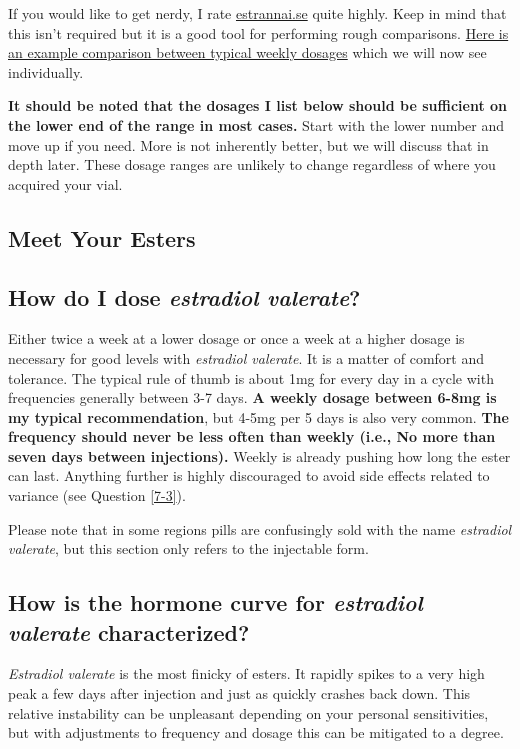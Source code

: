 \documentclass{article}
\begin{document}
If you would like to get nerdy, I rate \href{https://estrannai.se}{estrannai.se} quite highly. Keep in mind that this isn’t required but it is a good tool for performing rough comparisons. \href{https://estrannai.se/\#i0__cu,7,7,1-cu,5,7,3-cu,5,7,2}{Here is an example comparison between typical weekly dosages} which we will now see individually.

\textbf{It should be noted that the dosages I list below should be sufficient on the lower end of the range in most cases.} Start with the lower number and move up if you need. More is not inherently better, but we will discuss that in depth later. These dosage ranges are unlikely to change regardless of where you acquired your vial.

\subsection*{Meet Your Esters}

\subsection{How do I dose \textit{estradiol valerate}?}

Either twice a week at a lower dosage or once a week at a higher dosage is necessary for good levels with \textit{estradiol valerate}. It is a matter of comfort and tolerance. The typical rule of thumb is about 1mg for every day in a cycle with frequencies generally between 3-7 days. \textbf{A weekly dosage between 6-8mg is my typical recommendation}, but 4-5mg per 5 days is also very common. \textbf{The frequency should never be less often than weekly (i.e., No more than seven days between injections).} Weekly is already pushing how long the ester can last. Anything further is highly discouraged to avoid side effects related to variance (see Question \ref{7-3}).

Please note that in some regions pills are confusingly sold with the name \textit{estradiol valerate}, but this section only refers to the injectable form.

\subsection{How is the hormone curve for \textit{estradiol valerate} characterized?}

\textit{Estradiol valerate} is the most finicky of esters. It rapidly spikes to a very high peak a few days after injection and just as quickly crashes back down. This relative instability can be unpleasant depending on your personal sensitivities, but with adjustments to frequency and dosage this can be mitigated to a degree.
\end{document}
